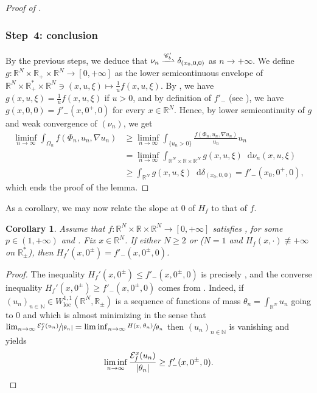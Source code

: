 \documentclass[10pt]{amsart}
\theoremstyle{plain}
\newtheorem{corollary}[theorem]{Corollary}
\theoremstyle{definition}
\newcommand{\dd}{\mathop{}\mathopen{}\mathrm{d}}
\newcommand{\N}{\mathbb{N}}
\newcommand{\R}{\mathbb{R}}
\newcommand{\Cspace}{\mathscr{C}}
\newcommand{\ener}{\mathcal{E}}
\newcommand{\loc}{\mathrm{loc}}
\DeclarePairedDelimiter{\abs}{\lvert}{\rvert}
\newcommand{\narrowto}{\xrightharpoonup{\Cspace_b'}}
\begin{document}
\begin{proof}[Proof of ]
\subsubsection*{Step~4: conclusion} By the previous steps, we deduce that $\nu_n \narrowto \delta_{(x_0,0,0)}$ as $n\to+\infty$. We define $g : \R^N \times \R_+ \times \R^N \to [0,+\infty]$ as the lower semicontinuous envelope of $\R^N \times \R_+^* \times \R^N \ni (x,u,\xi) \mapsto \frac 1u f(x,u,\xi)$. By , we have \(g(x,u,\xi)=\frac 1u f(x,u,\xi)\) if \(u>0\), and by definition of $f'_-$ (see ), we have \(g(x,0,0)=f'_-(x,0^+,0)\) for every \(x\in\R^N\). Hence, by lower semicontinuity of $g$ and weak convergence of $(\nu_n)$, we get
\begin{align*}
\liminf_{n\to\infty} \int_{\Omega_n} f(\Phi_n,u_n,\nabla u_n) &\geq \liminf_{n\to\infty} \int_{\{u_n>0\}} \frac{f(\Phi_n,u_n,\nabla u_n)}{u_n} u_n\\
&= \liminf_{n\to\infty} \int_{\R^N \times \R \times \R^N} g(x,u,\xi) \dd \nu_n(x,u,\xi)\\
&\geq \int_{\R^N} g(x,u,\xi) \dd \delta_{(x_0,0,0)}=f'_-(x_0,0^+,0),
\end{align*}
which ends the proof of the lemma.
\end{proof}

As a corollary, we may now relate the slope at $0$ of $H_f$ to that of $f$.

\begin{corollary}
Assume that $f : \R^N \times \R \times \R^N \to [0,+\infty]$ satisfies ,  for some \(p\in(1,+\infty)\) and . Fix $x\in \R^N$. If either $N \geq 2$ or ($N=1$ and $H_f(x,\cdot)\not\equiv +\infty$ on $\R_\pm^\ast$), then $H_f'(x,0^\pm) = f'_-(x,0^\pm,0)$.
\end{corollary}
\begin{proof}
The inequality $H_f'(x,0^\pm) \leq f'_-(x,0^\pm,0)$ is precisely , and the converse inequality $H_f'(x,0^\pm) \geq f'_-(x,0^\pm,0)$ comes from . Indeed, if $(u_n)_{n\in\N} \in W^{1,1}_\loc(\R^N,\R_\pm)$ is a sequence of functions of mass $\theta_n = \int_{\R^N} u_n$ going to $0$ and which is almost minimizing in the sense that $\lim_{n\to\infty} \sfrac{\ener^x_f(u_n)}{\abs{\theta_n}} = \liminf_{n\to\infty} \sfrac{H(x,\theta_n)}{\theta_n}$ then $(u_n)_{n\in\N}$ is vanishing and  yields
\[\liminf_{n\to\infty} \frac{\ener^x_f(u_n)}{\abs{\theta_n}} \geq f'_-(x,0^\pm,0).\qedhere\]
\end{proof}
\end{document}
